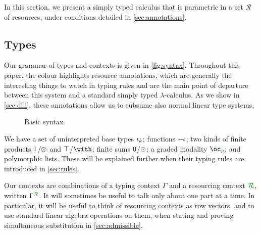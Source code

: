 In this section, we present a simply typed calculus \name{} that is parametric
in a set $\mathscr{R}$ of resources, under conditions detailed in
\autoref{sec:annotations}.

\subsection{Types}

Our grammar of types and contexts is given in \autoref{fig:syntax}.
Throughout this paper, the colour  highlights resource
annotations, which are generally the interesting things to watch in typing rules
and are the main point of departure between this system and a standard simply
typed $\lambda$-calculus.
As we show in \autoref{sec:dill}, these annotations allow us to subsume also
normal linear type systems. 


\begin{figure}
  \caption{Basic syntax}
  \label{fig:syntax}
\end{figure}

We have a set of uninterpreted base types $\iota_k$; functions $\multimap$; two
kinds of finite products $1$/$\otimes$ and
$\top$/$\withT{}{}$; finite sums $0$/$\oplus$; a graded modality
$\excl{\rho}{}$; and polymorphic lists.
These will be explained further when their typing rules are introduced in
\autoref{sec:rules}.

Our contexts are combinations of a typing context $\Gamma$ and a resourcing
context $\resctx R$, written $\ctx{\Gamma}{R}$.
It will sometimes be useful to talk only about one part at a time.
In particular, it will be useful to think of resourcing contexts as row
vectors, and to use standard linear algebra operations on them, when stating and
proving simultaneous substitution in \autoref{sec:admissible}.

